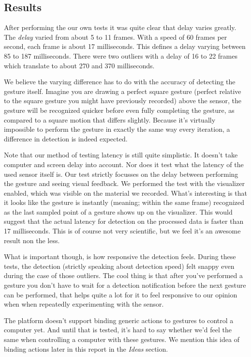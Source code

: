 \documentclass[a4paper]{article}
\begin{document}
  \subsection*{Results}
  After performing the our own tests it was quite clear that delay varies
  greatly. The \emph{delay} varied from about 5 to 11 frames. With a speed of 60
  frames per second, each frame is about 17 milliseconds. This defines a delay
  varying between 85 to 187 milliseconds. There were two outliers with a delay
  of 16 to 22 frames which translate to about 270 and 370 milliseconds.

  We believe the varying difference has to do with the accuracy of detecting the
  gesture itself. Imagine you are drawing a perfect square gesture (perfect
  relative to the square gesture you might have previously recorded) above the
  sensor, the gesture will be recognized quicker before even fully completing
  the gesture, as compared to a square motion that differs slightly. Because
  it's virtually impossible to perform the gesture in exactly the same way every
  iteration, a difference in detection is indeed expected.

  Note that our method of testing latency is still quite simplistic. It doesn't
  take computer and screen delay into account. Nor does it test what the latency
  of the used sensor itself is. Our test strictly focusses on the delay between
  performing the gesture and seeing visual feedback. We performed the test with
  the visualizer enabled, which was visible on the material we recorded. What's
  interesting is that it looks like the gesture is instantly (meaning; within
  the same frame) recognized as the last sampled point of a gesture shows up on
  the visualizer. This would suggest that the actual latency for detection on
  the processed data is faster than 17 milliseconds. This is of course not very
  scientific, but we feel it's an awesome result non the less.

  What is important though, is how responsive the detection feels. During these
  tests, the detection (strictly speaking about detection speed) felt snappy even
  during the case of those outliers. The cool thing is that after you've
  performed a gesture you don't have to wait for a detection notification before
  the next gesture can be performed, that helps quite a lot for it to feel
  responsive to our opinion when when repeatedly experimenting with the sensor.

  The platform doesn't support binding
  generic actions to gestures to control a computer yet. And until that is
  tested, it's hard to say whether we'd feel the same when controlling a
  computer with these gestures. We mention this idea of binding actions later in
  this report in the \emph{Ideas} section.
\end{document}
